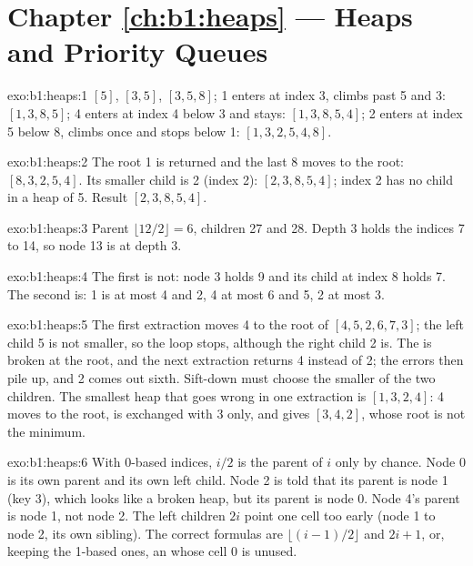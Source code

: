 \section*{Chapter \ref{ch:b1:heaps} --- Heaps and Priority Queues}

\begin{solution}{exo:b1:heaps:1}
$[5]$, $[3, 5]$, $[3, 5, 8]$; 1 enters at index 3, climbs past 5 and 3: $[1, 3, 8, 5]$; 4 enters at index 4 below 3 and
stays: $[1, 3, 8, 5, 4]$; 2 enters at index 5 below 8, climbs once and stops below 1: $[1, 3, 2, 5, 4, 8]$.
\end{solution}

\begin{solution}{exo:b1:heaps:2}
The root 1 is returned and the last  8 moves to the root: $[8, 3, 2, 5, 4]$. Its smaller child is 2 (index 2): $[2,
3, 8, 5, 4]$; index 2 has no child in a heap of 5. Result $[2, 3, 8, 5, 4]$.
\end{solution}

\begin{solution}{exo:b1:heaps:3}
Parent $\lfloor 12/2 \rfloor = 6$, children 27 and 28. Depth 3 holds the indices 7 to 14, so node 13 is at depth 3.
\end{solution}

\begin{solution}{exo:b1:heaps:4}
The first is not: node 3 holds 9 and its child at index 8 holds 7. The second is: 1 is at most 4 and 2, 4 at most 6 and
5, 2 at most 3.
\end{solution}

\begin{solution}{exo:b1:heaps:5}
The first extraction moves 4 to the root of $[4, 5, 2, 6, 7, 3]$; the left child 5 is not smaller, so the loop stops,
although the right child 2 is. The  is broken at the root, and the next extraction returns 4 instead of 2;
the errors then pile up, and 2 comes out sixth. Sift-down must choose the smaller of the two children. The smallest
heap that goes wrong in one extraction is $[1, 3, 2, 4]$: 4 moves to the root, is exchanged with 3 only, and gives $[3,
4, 2]$, whose root is not the minimum.
\end{solution}

\begin{solution}{exo:b1:heaps:6}
With 0-based indices, $i/2$ is the parent of $i$ only by chance. Node 0 is its own parent and its own left child. Node 2
is told that its parent is node 1 (key 3), which looks like a broken heap, but its parent is node 0. Node 4's parent is
node 1, not node 2. The left children $2i$ point one cell too early (node 1 to node 2, its own sibling). The correct
formulas are $\lfloor (i - 1)/2 \rfloor$ and $2i + 1$, or, keeping the 1-based ones, an  whose cell 0 is unused.
\end{solution}

